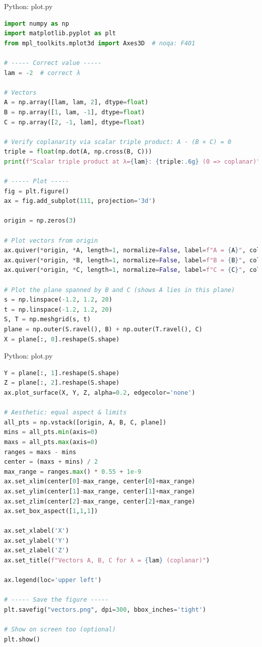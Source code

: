\documentclass{beamer}
\numberwithin{equation}{section}
\theoremstyle{remark}
\begin{document}
\begin{frame}[fragile]{Python: plot.py}
\begin{lstlisting}[language=Python]
  import numpy as np
import matplotlib.pyplot as plt
from mpl_toolkits.mplot3d import Axes3D  # noqa: F401

# ----- Correct value -----
lam = -2  # correct λ

# Vectors
A = np.array([lam, lam, 2], dtype=float)
B = np.array([1, lam, -1], dtype=float)
C = np.array([2, -1, lam], dtype=float)

# Verify coplanarity via scalar triple product: A · (B × C) = 0
triple = float(np.dot(A, np.cross(B, C)))
print(f"Scalar triple product at λ={lam}: {triple:.6g} (0 => coplanar)")

# ----- Plot -----
fig = plt.figure()
ax = fig.add_subplot(111, projection='3d')

origin = np.zeros(3)

# Plot vectors from origin
ax.quiver(*origin, *A, length=1, normalize=False, label=f"A = {A}", color='r')
ax.quiver(*origin, *B, length=1, normalize=False, label=f"B = {B}", color='g')
ax.quiver(*origin, *C, length=1, normalize=False, label=f"C = {C}", color='b')

# Plot the plane spanned by B and C (shows A lies in this plane)
s = np.linspace(-1.2, 1.2, 20)
t = np.linspace(-1.2, 1.2, 20)
S, T = np.meshgrid(s, t)
plane = np.outer(S.ravel(), B) + np.outer(T.ravel(), C)
X = plane[:, 0].reshape(S.shape)
\end{lstlisting}
\end{frame}   

\begin{frame}[fragile]{Python: plot.py}
\begin{lstlisting}[language=Python]
Y = plane[:, 1].reshape(S.shape)
Z = plane[:, 2].reshape(S.shape)
ax.plot_surface(X, Y, Z, alpha=0.2, edgecolor='none')

# Aesthetic: equal aspect & limits
all_pts = np.vstack([origin, A, B, C, plane])
mins = all_pts.min(axis=0)
maxs = all_pts.max(axis=0)
ranges = maxs - mins
center = (maxs + mins) / 2
max_range = ranges.max() * 0.55 + 1e-9
ax.set_xlim(center[0]-max_range, center[0]+max_range)
ax.set_ylim(center[1]-max_range, center[1]+max_range)
ax.set_zlim(center[2]-max_range, center[2]+max_range)
ax.set_box_aspect([1,1,1])

ax.set_xlabel('X')
ax.set_ylabel('Y')
ax.set_zlabel('Z')
ax.set_title(f"Vectors A, B, C for λ = {lam} (coplanar)")

ax.legend(loc='upper left')

# ----- Save the figure -----
plt.savefig("vectors.png", dpi=300, bbox_inches='tight')

# Show on screen too (optional)
plt.show()

\end{lstlisting}
\end{frame}   
\end{document}
